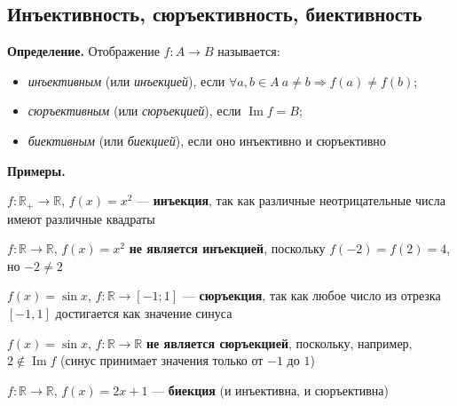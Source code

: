 \documentclass[a4paper,12pt]{article}
\theoremstyle{definition}
\theoremstyle{plain}
\theoremstyle{remark}
\begin{document}
	\subsection{Инъективность, сюръективность, биективность}
	
	\noindent \textbf{Определение.} Отображение $f \colon A \to B$ называется:
	\begin{itemize}
		\item \textit{инъективным} (или \textit{инъекцией}), если $\forall a, b \in A \ a \neq b \Rightarrow f(a) \neq f(b)$;
		\item \textit{сюръективным} (или \textit{сюръекцией}), если $\operatorname{Im} f = B$;
		\item \textit{биективным} (или \textit{биекцией}), если оно инъективно и сюръективно
	\end{itemize}
	
	\medskip
	\noindent \textbf{Примеры.}
	
	\begin{tcolorbox}[colback=gray!5, colframe=gray!50, title=Инъекция]
		$f \colon \mathbb{R}_+ \to \mathbb{R}$, $f(x) = x^2$ — \textbf{инъекция}, так как различные неотрицательные числа имеют различные квадраты
	\end{tcolorbox}
	
	\begin{tcolorbox}[colback=gray!5, colframe=gray!50, title=Не инъекция]
		$f \colon \mathbb{R} \to \mathbb{R}$, $f(x) = x^2$ \textbf{не является инъекцией}, поскольку $f(-2) = f(2) = 4$, но $-2 \neq 2$
	\end{tcolorbox}
	
	\begin{tcolorbox}[colback=gray!5, colframe=gray!50, title=Сюръекция]
		$f(x) = \sin x$, $f \colon \mathbb{R} \to [-1; 1]$ — \textbf{сюръекция}, так как любое число из отрезка $[-1, 1]$ достигается как значение синуса
	\end{tcolorbox}
	
	\begin{tcolorbox}[colback=gray!5, colframe=gray!50, title=Не сюръекция]
		$f(x) = \sin x$, $f \colon \mathbb{R} \to \mathbb{R}$ \textbf{не является сюръекцией}, поскольку, например, $2 \notin \operatorname{Im} f$ (синус принимает значения только от $-1$ до $1$)
	\end{tcolorbox}
	
	\begin{tcolorbox}[colback=gray!5, colframe=gray!50, title=Биекция]
		$f \colon \mathbb{R} \to \mathbb{R}$, $f(x) = 2x + 1$ — \textbf{биекция} (и инъективна, и сюръективна)
	\end{tcolorbox}
	
\end{document}
